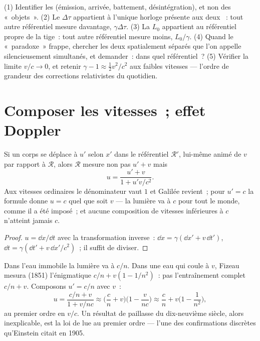 \begin{method}\label{met:b3:relativistic-kinematics:method}
(1) Identifier les \emph{} (émission, arrivée, battement,
désintégration), et non des «~objets~». (2) Le 
$\Delta\tau$ appartient à l'unique horloge présente aux deux
~: tout autre référentiel mesure davantage,
$\gamma\Delta\tau$. (3) La  $L_0$ appartient au
référentiel propre de la tige~: tout autre référentiel mesure moins,
$L_0/\gamma$. (4) Quand le «~paradoxe~» frappe, chercher les deux
 spatialement séparés que l'on appelle silencieusement
simultanés, et demander~: dans quel référentiel~? (5) Vérifier la
limite $v/c \to 0$, et retenir $\gamma - 1 \approx \tfrac12 v^2/c^2$
aux faibles vitesses --- l'ordre de grandeur des corrections
relativistes du quotidien.
\end{method}

\section{Composer les vitesses~; effet Doppler}

\begin{proposition}\label{prop:b3:relativistic-kinematics:addition}
Si un corps se déplace à $u'$ selon $x'$ dans le référentiel
$\mathcal R'$, lui-même animé de $v$ par rapport à $\mathcal R$, alors
$\mathcal R$ mesure non pas $u' + v$ mais
\[
u = \frac{u' + v}{1 + u'v/c^2} .
\]
Aux vitesses ordinaires le dénominateur vaut $1$ et Galilée revient~;
pour $u' = c$ la formule donne $u = c$ quel que soit $v$ --- la lumière
va à $c$ pour tout le monde, comme il a été imposé~; et aucune
composition de vitesses inférieures à $c$ n'atteint jamais $c$.
\end{proposition}

\begin{proof}
$u = \dd x/\dd t$ avec la transformation inverse~: $\dd x =
\gamma(\dd x' + v\,\dd t')$, $\dd t = \gamma(\dd t' + v\,\dd x'/c^2)$~;
il suffit de diviser.
\end{proof}

\begin{example}\label{ex:b3:relativistic-kinematics:fizeau}
Dans l'eau immobile la lumière va à $c/n$. Dans une eau qui coule à
$v$, Fizeau mesura (1851) l'énigmatique $c/n + v(1 - 1/n^2)$~: pas
l'entraînement complet $c/n + v$. Composons $u' = c/n$ avec $v$~:
\[
u = \frac{c/n + v}{1 + v/nc}
\approx \Big(\frac{c}{n} + v\Big)\Big(1 - \frac{v}{nc}\Big)
\approx \frac{c}{n} + v\Big(1 - \frac{1}{n^2}\Big) ,
\]
au premier ordre en $v/c$. Un résultat de paillasse du dix-neuvième
siècle, alors inexplicable, est la loi de  lue
au premier ordre --- l'une des confirmations discrètes qu'Einstein
citait en 1905.
\end{example}

